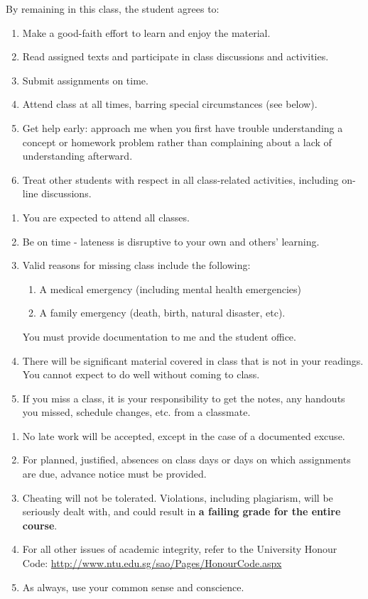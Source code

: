 \documentclass[a4paper,landscape,headrule,footrule,xetex]{foils}
\begin{document}
By remaining in this class, the student agrees to:
\begin{enumerate}
\item  Make a good-faith effort to learn and enjoy the material.
\item  Read assigned texts and participate in class discussions and activities.
\item Submit assignments on time.
\item Attend class at all times, barring special circumstances (see below).
\item Get help early: approach me when you first have trouble understanding a concept or homework problem rather than complaining about a lack of understanding afterward.
\item Treat other students with respect in all class-related activities, including on-line discussions.
\end{enumerate}
\begin{enumerate}
\item You are expected to attend all classes.
\item Be on time - lateness is disruptive to your own and others' learning.
\item Valid reasons for missing class include the following:
\begin{enumerate}
\item A medical emergency (including mental health emergencies)
\item A family emergency (death, birth, natural disaster, etc).
\end{enumerate}
You must provide documentation to me and the student office.
\item There will be significant material covered in class that is not in your readings.  You cannot expect to do well without coming to class.
\item If you miss a class, it is your responsibility to get the notes, any handouts you missed, schedule changes, etc. from a classmate.
\end{enumerate}

\begin{enumerate}
\item No late work will be accepted, except in the case of a documented excuse.
\item For planned, justified, absences on class days or days on which assignments are due, advance notice must be provided.
\item Cheating will not be tolerated. Violations, including plagiarism, will be seriously dealt with, and could result in \textbf{a failing grade for the entire course}.
\item For all other issues of academic integrity, refer to the University Honour Code: \url{http://www.ntu.edu.sg/sao/Pages/HonourCode.aspx}
\item As always, use your common sense and conscience.
\end{enumerate}
\end{document}
